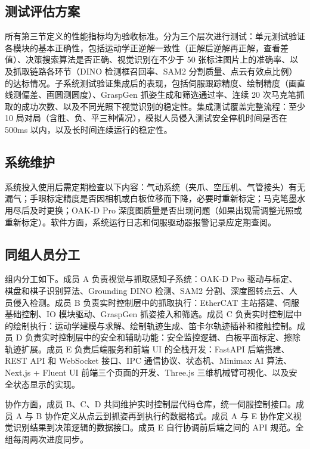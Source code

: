 \documentclass[a4paper, 12pt, oneside]{ctexart}
\begin{document}
\subsection{测试评估方案}

所有第三节定义的性能指标均为验收标准。分为三个层次进行测试：单元测试验证各模块的基本正确性，包括运动学正逆解一致性（正解后逆解再正解，查看差值）、决策搜索算法是否正确、视觉识别在不少于 50 张标注图片上的准确率、以及抓取链路各环节（DINO 检测框召回率、SAM2 分割质量、点云有效点比例）的达标情况。子系统测试验证集成后的表现，包括伺服跟踪精度、绘制精度（画直线测偏差、画圆测圆度）、GraspGen 抓姿生成和筛选通过率、连续 20 次马克笔抓取的成功次数、以及不同光照下视觉识别的稳定性。集成测试覆盖完整流程：至少 10 局对局（含胜、负、平三种情况），模拟人员侵入测试安全停机时间是否在 500ms 以内，以及长时间连续运行的稳定性。

\subsection{系统维护}

系统投入使用后需定期检查以下内容：气动系统（夹爪、空压机、气管接头）有无漏气；手眼标定精度是否因相机或白板位移而下降，必要时重新标定；马克笔墨水用尽后及时更换；OAK-D Pro 深度图质量是否出现问题（如果出现需调整光照或重新标定）。软件方面，系统运行日志和伺服驱动器报警记录应定期查阅。

\subsection{同组人员分工}

组内分工如下。成员 A 负责视觉与抓取感知子系统：OAK-D Pro 驱动与标定、棋盘和棋子识别算法、Grounding DINO 检测、SAM2 分割、深度图转点云、人员侵入检测。成员 B 负责实时控制层中的抓取执行：EtherCAT 主站搭建、伺服基础控制、IO 模块驱动、GraspGen 抓姿接入和筛选。成员 C 负责实时控制层中的绘制执行：运动学建模与求解、绘制轨迹生成、笛卡尔轨迹插补和接触控制。成员 D 负责实时控制层中的安全和辅助功能：安全监控逻辑、白板平面标定、擦除轨迹扩展。成员 E 负责后端服务和前端 UI 的全栈开发：FastAPI 后端搭建、REST API 和 WebSocket 接口、IPC 通信协议、状态机、Minimax AI 算法、Next.js + Fluent UI 前端三个页面的开发、Three.js 三维机械臂可视化、以及安全状态显示的实现。

协作方面，成员 B、C、D 共同维护实时控制层代码仓库，统一伺服控制接口。成员 A 与 B 协作定义从点云到抓姿再到执行的数据格式。成员 A 与 E 协作定义视觉识别结果到决策逻辑的数据接口。成员 E 自行协调前后端之间的 API 规范。全组每周两次进度同步。
\end{document}
